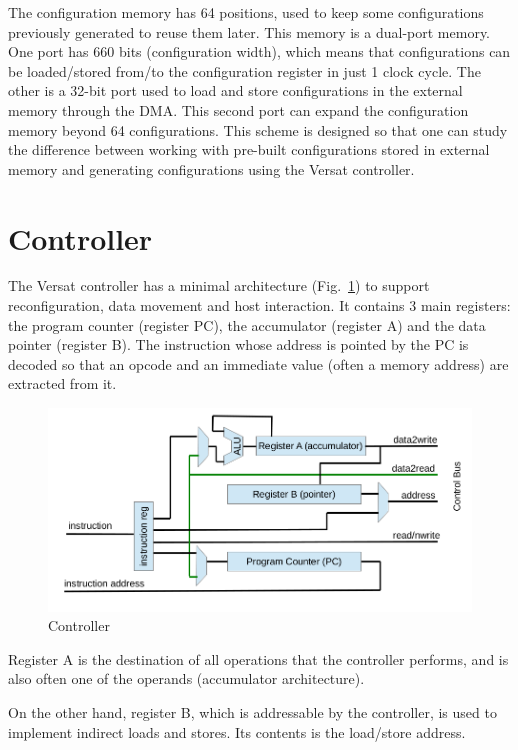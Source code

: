 The configuration memory has 64 positions, used to keep some
configurations previously generated to reuse them later. This memory
is a dual-port memory. One port has 660 bits (configuration width),
which means that configurations can be loaded/stored from/to the
configuration register in just 1 clock cycle. The other is a 32-bit
port used to load and store configurations in the external memory
through the DMA. This second port can expand the configuration memory
beyond 64 configurations. This scheme is designed so that one can
study the difference between working with pre-built configurations
stored in external memory and generating configurations using the
Versat controller.

\section{Controller}
\label{section:controller}

The Versat controller has a minimal architecture
(Fig.~\ref{fig_control}) to support reconfiguration, data movement and
host interaction. It contains 3 main registers: the program counter
(register PC), the accumulator (register A) and the data pointer
(register B). The instruction whose address is pointed by the PC is
decoded so that an opcode and an immediate value (often a memory
address) are extracted from it.

\begin{figure}[!htb]
\centering
\includegraphics[width=.8\textwidth]{drawings/control}
\caption{Controller}
\label{fig_control}
\end{figure}

Register A is the destination of all operations that the controller
performs, and is also often one of the operands (accumulator
architecture).

On the other hand, register B, which is addressable by the controller,
is used to implement indirect loads and stores. Its contents is the
load/store address.

